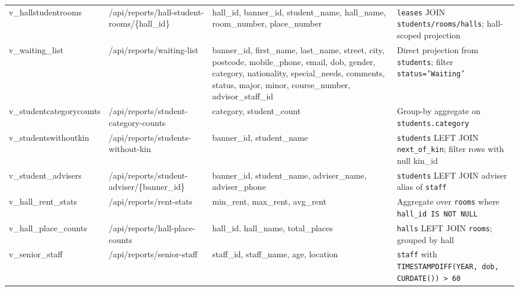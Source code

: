 \documentclass[11pt,a4paper]{article}
\begin{document}
\begin{longtable}{>{\raggedright\arraybackslash}p{} >{\raggedright\arraybackslash}p{} >{\raggedright\arraybackslash}p{} >{\raggedright\arraybackslash}p{}}
v\_hall\newline student\newline rooms & /api/reports/\newline hall-student-rooms/\{hall\_id\} & hall\_id, banner\_id, student\_name, hall\_name, room\_number, place\_number & \texttt{leases} JOIN \texttt{students/rooms/halls}; hall-scoped projection \\

v\_waiting\_list & /api/reports/waiting-list & banner\_id, first\_name, last\_name, street, city, postcode, mobile\_phone, email, dob, gender, category, nationality, special\_needs, comments, status, major, minor, course\_number, advisor\_staff\_id & Direct projection from \texttt{students}; filter \texttt{status='Waiting'} \\

v\_student\newline category\newline counts & /api/reports/\newline student-category-counts & category, student\_count & Group-by aggregate on \texttt{students.category} \\

v\_students\newline without\newline kin & /api/reports/\newline students-without-kin & banner\_id, student\_name & \texttt{students} LEFT JOIN \texttt{next\_of\_kin}; filter rows with null kin\_id \\

v\_student\_advisers & /api/reports/student-adviser/\{banner\_id\} & banner\_id, student\_name, adviser\_name, adviser\_phone & \texttt{students} LEFT JOIN adviser alias of \texttt{staff} \\

v\_hall\_rent\_stats & /api/reports/rent-stats & min\_rent, max\_rent, avg\_rent & Aggregate over \texttt{rooms} where \texttt{hall\_id IS NOT NULL} \\

v\_hall\_place\_counts & /api/reports/hall-place-counts & hall\_id, hall\_name, total\_places & \texttt{halls} LEFT JOIN \texttt{rooms}; grouped by hall \\

v\_senior\_staff & /api/reports/senior-staff & staff\_id, staff\_name, age, location & \texttt{staff} with \texttt{TIMESTAMPDIFF(YEAR, dob, CURDATE()) > 60} \\
\bottomrule
\end{longtable}
\endgroup
\end{document}
